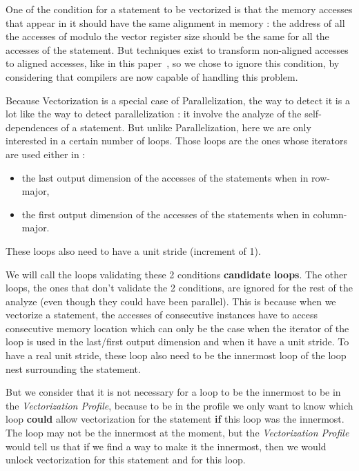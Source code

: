 \documentclass[paper=a4, fontsize=11.5pt]{scrartcl}
\numberwithin{equation}{section}        %
\numberwithin{figure}{section}          %
\numberwithin{table}{section}               %
\begin{document}
        One of the condition for a statement to be vectorized is that the memory accesses
        that appear in it should have the same alignment in memory : the address of all the
        accesses of modulo the vector register size should be the same for all the accesses
        of the statement.
        But techniques exist to transform non-aligned accesses to aligned accesses, like
        in this paper~\cite{Eichenberger:2004:VSA:996893.996853}, so we chose to ignore this
        condition, by considering that compilers are now capable of handling this problem.

        Because Vectorization is a special case of Parallelization, the way to detect it
        is a lot like the way to detect parallelization : it involve the analyze of
        the \glspl{self-dependence} of a statement. But unlike Parallelization, here we are
        only interested in a certain number of loops. Those loops are the ones whose iterators
        are used either in :
        \begin{itemize}
            \item the last output dimension of the accesses of the statements when in row-major,
            \item the first output dimension of the accesses of the statements when in column-major.
        \end{itemize}
        These loops also need to have a unit stride (increment of 1).

        We will call the loops validating these 2 conditions \textbf{candidate loops}.
        The other loops, the ones that don't validate the 2 conditions, are ignored for
        the rest of the analyze (even though they could have been parallel). This is
        because when we vectorize a statement, the accesses of consecutive instances have
        to access consecutive memory location which can only be the case when the iterator
        of the loop is used in the last/first output dimension and when it have a unit stride.
        To have a real unit stride, these loop also need to be the innermost loop of the loop nest
        surrounding the statement.
        
        But we consider that it is not necessary for a loop to be the innermost to be
        in the \textit{Vectorization Profile}, because to be in the profile
        we only want to know which loop \textbf{could} allow vectorization
        for the statement \textbf{if} this loop was the innermost. The loop may not be
        the innermost at the moment, but the \textit{Vectorization Profile} would tell
        us that if we find a way to make it the innermost, then we would unlock vectorization
        for this statement and for this loop.
\end{document}
